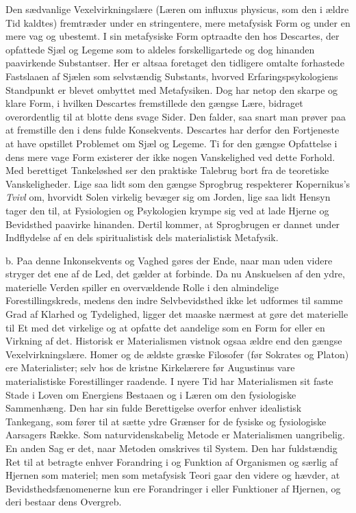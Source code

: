 \documentclass[12pt,a4paper,openany]{book}
\newcommand{\opage}[1]{\marginnote{\footnotesize\textit{[#1]}}}
\begin{document}
Den sædvanlige Vexelvirkningslære (Læren om influxus physicus, som den i
ældre Tid kaldtes) fremtræder under en stringentere, mere metafysisk
Form og under en mere vag og ubestemt. I sin metafysiske Form optraadte
den hos Descartes, der opfattede Sjæl og Legeme som to aldeles
forskelligartede og dog hinanden paavirkende Substantser. Her er altsaa
foretaget den tidligere omtalte forhastede Fastslaaen af Sjælen som
selvstændig Substants, hvorved Erfaringspsykologiens Standpunkt er
blevet ombyttet med Metafysiken. Dog har netop den skarpe og klare Form,
i hvilken Descartes fremstillede den gængse Lære, bidraget overordentlig
til at blotte dens svage Sider. Den falder, saa snart man prøver paa at
fremstille den i dens fulde Konsekvents. Descartes har derfor den
Fortjeneste at have opstillet Problemet om Sjæl og Legeme. Ti for den
gængse Opfattelse i dens mere vage Form existerer der ikke
\opage{71}nogen Vanskelighed ved dette Forhold. Med berettiget
Tankeløshed ser den praktiske Talebrug bort fra de teoretiske
Vanskeligheder. Lige saa lidt som den gængse Sprogbrug respekterer
Kopernikus’s \emph{Tvivl} om, hvorvidt Solen virkelig bevæger sig om
Jorden, lige saa lidt Hensyn tager den til, at Fysiologien og
Psykologien krympe sig ved at lade Hjerne og Bevidsthed paavirke
hinanden. Dertil kommer, at Sprogbrugen er dannet under Indflydelse af
en dels spiritualistisk dels materialistisk Metafysik.

b. Paa denne Inkonsekvents og Vaghed gøres der Ende, naar man uden
videre stryger det ene af de Led, det gælder at forbinde. Da nu
Anskuelsen af den ydre, materielle Verden spiller en overvældende Rolle
i den almindelige Forestillingskreds, medens den indre Selvbevidsthed
ikke let udformes til samme Grad af Klarhed og Tydelighed, ligger det
maaske nærmest at gøre det materielle til Et med det virkelige og at
opfatte det aandelige som en Form for eller en Virkning af det.
Historisk er Materialismen vistnok ogsaa ældre end den gængse
Vexelvirkningslære. Homer og de ældste græske Filosofer (før Sokrates og
Platon) ere Materialister; selv hos de kristne Kirkelærere før
Augustinus vare materialistiske Forestillinger raadende. I nyere Tid har
Materialismen sit faste Stade i Loven om Energiens Bestaaen og i Læren
om den fysiologiske Sammenhæng. Den har sin fulde Berettigelse overfor
enhver idealistisk Tankegang, som fører til at sætte ydre Grænser for de
fysiske og fysiologiske Aarsagers Række. Som naturvidenskabelig Metode
er Materialismen uangribelig. En anden Sag er det, naar Metoden
omskrives til System. Den har fuldstændig Ret til at betragte enhver
Forandring i og Funktion af Organismen og særlig af Hjernen som
materiel; men som metafysisk Teori gaar den videre og hævder, at
Bevidsthedsfænomenerne kun ere Forandringer i eller Funktioner af
Hjernen, og deri bestaar dens Overgreb.
\end{document}
